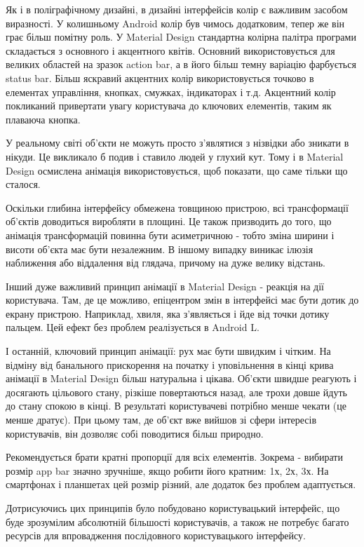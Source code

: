 \documentclass[../main.tex]{subfiles}
\begin{document}
			Як і в поліграфічному дизайні, в дизайні інтерфейсів колір є важливим засобом виразності. У колишньому Android колір був чимось додатковим, тепер же він грає більш помітну роль. У Material Design стандартна колірна палітра програми складається з основного і акцентного квітів. Основний використовується для великих областей на зразок action bar, а в його більш темну варіацію фарбується status bar. Більш яскравий акцентних колір використовується точково в елементах управління, кнопках, смужках, індикаторах і т.д. Акцентний колір покликаний привертати увагу користувача до ключових елементів, таким як плаваюча кнопка.
			
			У реальному світі об'єкти не можуть просто з'являтися з нізвідки або зникати в нікуди. Це викликало б подив і ставило людей у глухий кут. Тому і в Material Design осмислена анімація використовується, щоб показати, що саме тільки що сталося.
			
			Оскільки глибина інтерфейсу обмежена товщиною пристрою, всі трансформації об'єктів доводиться виробляти в площині. Це також призводить до того, що анімація трансформацій повинна бути асиметричною - тобто зміна ширини і висоти об'єкта має бути незалежним. В іншому випадку виникає ілюзія наближення або віддалення від глядача, причому на дуже велику відстань.
			
			Інший дуже важливий принцип анімації в Material Design - реакція на дії користувача. Там, де це можливо, епіцентром змін в інтерфейсі має бути дотик до екрану пристрою. Наприклад, хвиля, яка з'являється і йде від точки дотику пальцем. Цей ефект без проблем реалізується в Android L.
			
			І останній, ключовий принцип анімації: рух має бути швидким і чітким. На відміну від банального прискорення на початку і уповільнення в кінці крива анімації в Material Design більш натуральна і цікава. Об'єкти швидше реагують і досягають цільового стану, різкіше повертаються назад, але трохи довше йдуть до стану спокою в кінці. В результаті користувачеві потрібно менше чекати (це менше дратує). При цьому там, де об'єкт вже вийшов зі сфери інтересів користувачів, він дозволяє собі поводитися більш природно.
			
			Рекомендується брати кратні пропорції для всіх елементів. Зокрема - вибирати розмір app bar значно зручніше, якщо робити його кратним: 1х, 2х, 3х. На смартфонах і планшетах цей розмір різний, але додаток без проблем адаптується.
			
			Дотрисуючись цих принципів було побудовано користувацький інтерфейс, що буде зрозумілим абсолютній більшості користувачів, а також не потребує багато ресурсів для впровадження послідовного користувацького інтерфейсу.
	
\end{document}
